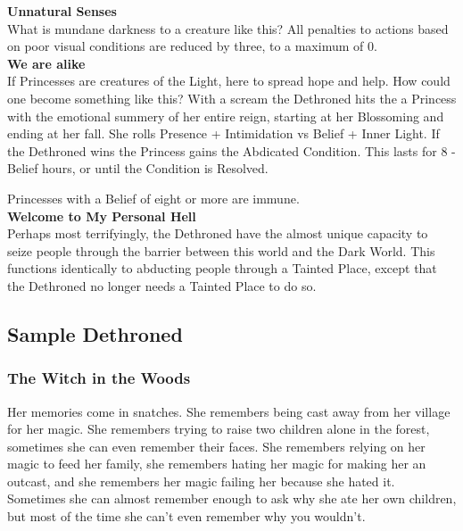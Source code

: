 \noindent \textbf{Unnatural Senses}\\

\noindent What is mundane darkness to a creature like this? All penalties to actions based on poor visual conditions are reduced by three, to a maximum of 0.\\

\noindent \textbf{We are alike}\\

\noindent If Princesses are creatures of the Light, here to spread hope and help. How could one become something like this? With a scream the Dethroned hits the a Princess with the emotional summery of her entire reign, starting at her Blossoming and ending at her fall. She rolls Presence + Intimidation vs Belief + Inner Light. If the Dethroned wins the Princess gains the Abdicated Condition. This lasts for 8 - Belief hours, or until the Condition is Resolved. 

Princesses with a Belief of eight or more are immune. \\

\noindent \textbf{Welcome to My Personal Hell}\\

\noindent Perhaps most terrifyingly, the Dethroned have the almost unique capacity to seize people through the barrier between this world and the Dark World. This functions identically to abducting people through a Tainted Place, except that the Dethroned no longer needs a Tainted Place to do so.\\

\subsection*{Sample Dethroned}

\subsubsection*{The Witch in the Woods}

Her memories come in snatches. She remembers being cast away from her village for her magic. She remembers trying to raise two children alone in the forest, sometimes she can even remember their faces. She remembers relying on her magic to feed her family, she remembers hating her magic for making her an outcast, and she remembers her magic failing her because she hated it. Sometimes she can almost remember enough to ask why she ate her own children, but most of the time she can't even remember why you wouldn't. 

